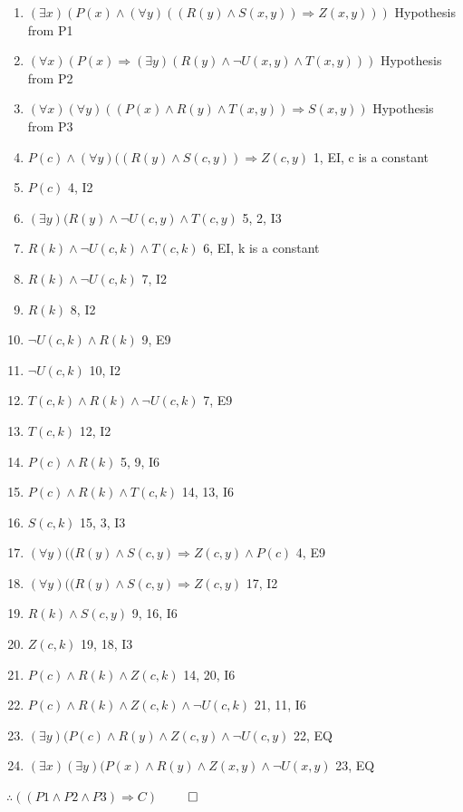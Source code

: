\documentclass{article}
\begin{document}
			\begin{enumerate}
				\item $(\exists x)(P(x) \land (\forall y)((R(y) \land S(x, y)) \Rightarrow Z(x, y)))$ \hfill Hypothesis from P1
				\item $(\forall x)(P(x) \Rightarrow (\exists y)(R(y) \land \lnot U(x, y) \land T(x, y)))$ \hfill Hypothesis from P2
				\item $(\forall x)(\forall y)((P(x) \land R(y) \land T(x, y)) \Rightarrow S(x, y))$ \hfill Hypothesis from P3
				\item $P(c) \land (\forall y)((R(y) \land S(c, y)) \Rightarrow Z(c, y)$ \hfill 1, EI, c is a constant
				\item $P(c)$ \hfill 4, I2
				\item $(\exists y)(R(y) \land \lnot U(c, y) \land T(c, y)$ \hfill 5, 2, I3
				\item $R(k) \land \lnot U(c, k) \land T(c, k)$ \hfill 6, EI, k is a constant
				\item $R(k) \land \lnot U(c, k)$ \hfill 7, I2
				\item $R(k)$ \hfill 8, I2
				\item $\lnot U(c, k) \land R(k)$ \hfill 9, E9
				\item $\lnot U(c, k)$ \hfill 10, I2
				\item $T(c, k) \land R(k) \land \lnot U(c, k)$ \hfill 7, E9
				\item $T(c, k)$ \hfill 12, I2
				\item $P(c) \land R(k)$ \hfill 5, 9, I6
				\item $P(c) \land R(k) \land T(c, k)$ \hfill 14, 13, I6
				\item $S(c, k)$ \hfill 15, 3, I3
				\item $(\forall y)((R(y) \land S(c, y) \Rightarrow Z(c, y) \land P(c)$ \hfill 4, E9
				\item $(\forall y)((R(y) \land S(c, y) \Rightarrow Z(c, y)$ \hfill 17, I2
				\item $R(k) \land S(c, y)$ \hfill 9, 16, I6
				\item $Z(c, k)$ \hfill 19, 18, I3
				\item $P(c) \land R(k) \land Z(c, k)$ \hfill 14, 20, I6
				\item $P(c) \land R(k) \land Z(c, k) \land \lnot U(c, k)$ \hfill 21, 11, I6
				\item $(\exists y)(P(c) \land R(y) \land Z(c, y) \land \lnot U(c, y)$ \hfill 22, EQ
				\item $(\exists x)(\exists y)(P(x) \land R(y) \land Z(x, y) \land \lnot U(x, y)$ \hfill 23, EQ
			\end{enumerate}
			$\therefore ((P1 \land P2 \land P3) \Rightarrow C)$ \hfill $\qed$ \\
\end{document}

